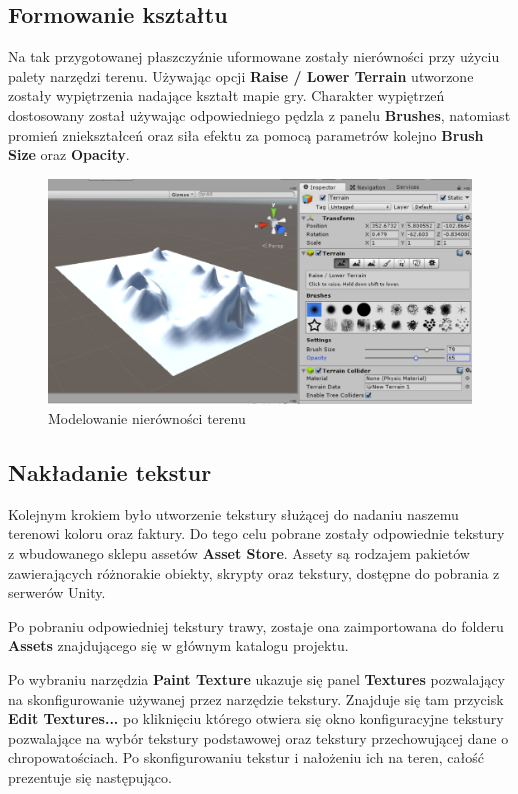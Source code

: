 \documentclass[openright]{xmgr}
\newcommand{\name}[1]{\textbf{\textcolor{NavyBlue}{#1}}}
\begin{document}
    \subsection{Formowanie kształtu} 

        Na tak przygotowanej płaszczyźnie uformowane zostały nierówności przy użyciu palety narzędzi terenu. Używając opcji \name{Raise / Lower Terrain} utworzone zostały wypiętrzenia nadające kształt mapie gry. Charakter wypiętrzeń dostosowany został używając odpowiedniego pędzla z panelu \name{Brushes}, natomiast promień zniekształceń oraz siła efektu za pomocą parametrów kolejno \name{Brush Size} oraz \name {Opacity}.

        \begin{figure}[H]
        \includegraphics[width=\textwidth]{teren_2.png}
        \caption{Modelowanie nierówności terenu}
        \end{figure}

    \subsection{Nakładanie tekstur}

        Kolejnym krokiem było utworzenie tekstury służącej do nadaniu naszemu terenowi koloru oraz faktury. Do tego celu pobrane zostały odpowiednie tekstury z wbudowanego sklepu assetów \name{Asset Store}. Assety są rodzajem pakietów zawierających różnorakie obiekty, skrypty oraz tekstury, dostępne do pobrania z serwerów Unity.

        Po pobraniu odpowiedniej tekstury trawy, zostaje ona zaimportowana do folderu \name{Assets} znajdującego się w głównym katalogu projektu.

        Po wybraniu narzędzia \name{Paint Texture} ukazuje się panel \name{Textures} pozwalający na skonfigurowanie używanej przez narzędzie tekstury. Znajduje się tam przycisk \name{Edit Textures...} po kliknięciu którego otwiera się okno konfiguracyjne tekstury pozwalające na wybór tekstury podstawowej oraz tekstury przechowującej dane o chropowatościach. Po skonfigurowaniu tekstur i nałożeniu ich na teren, całość prezentuje się następująco.
\end{document}
